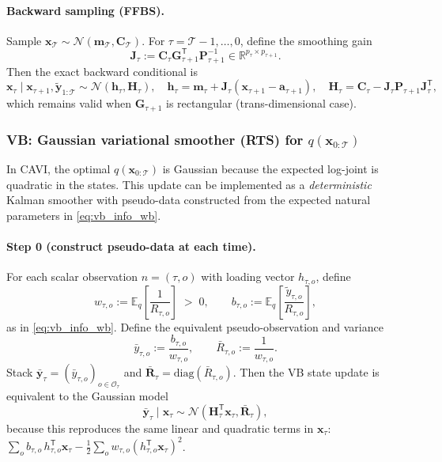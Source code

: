 \documentclass[11pt]{article}
\newcommand{\R}{\mathbb{R}}
\newcommand{\1}{\mathbb{I}}
\newcommand{\N}{\mathcal{N}}
\newcommand{\diag}{\mathrm{diag}}
\newcommand{\T}{\mathsf{T}}
\newcommand{\E}{\mathbb{E}}
\begin{document}
\paragraph{Backward sampling (FFBS).}
Sample $\bm x_\mathcal{T}\sim \N(\bm m_\mathcal{T},\bm C_\mathcal{T})$.
For $\tau=\mathcal{T}-1,\dots,0$, define the smoothing gain
\begin{equation}
\bm J_\tau := \bm C_\tau \bm G_{\tau+1}^\T \bm P_{\tau+1}^{-1}
\in\R^{p_\tau\times p_{\tau+1}}. \label{eq:ffbs_J}
\end{equation}
Then the exact backward conditional is
\begin{equation}
\bm x_\tau \mid \bm x_{\tau+1},\tilde{\bm y}_{1:\mathcal{T}}
\sim \N(\bm h_\tau,\bm H_\tau),
\quad
\bm h_\tau=\bm m_\tau+\bm J_\tau(\bm x_{\tau+1}-\bm a_{\tau+1}),
\quad
\bm H_\tau=\bm C_\tau-\bm J_\tau \bm P_{\tau+1}\bm J_\tau^\T,
\label{eq:ffbs_backward}
\end{equation}
which remains valid when $\bm G_{\tau+1}$ is rectangular (trans-dimensional case).

\subsubsection*{VB: Gaussian variational smoother (RTS) for $q(\bm x_{0:\mathcal{T}})$}
In CAVI, the optimal $q(\bm x_{0:\mathcal{T}})$ is Gaussian because the expected log-joint is quadratic in the states.
This update can be implemented as a \emph{deterministic} Kalman smoother with pseudo-data constructed from the
expected natural parameters in \eqref{eq:vb_info_wb}.

\paragraph{Step 0 (construct pseudo-data at each time).}
For each scalar observation $n=(\tau,o)$ with loading vector $h_{\tau,o}$, define
\[
w_{\tau,o}:=\E_q\!\left[\frac{1}{R_{\tau,o}}\right] \;>\;0,
\qquad
b_{\tau,o}:=\E_q\!\left[\frac{\tilde y_{\tau,o}}{R_{\tau,o}}\right],
\]
as in \eqref{eq:vb_info_wb}. Define the equivalent pseudo-observation and variance
\begin{equation}
\bar y_{\tau,o}:=\frac{b_{\tau,o}}{w_{\tau,o}},
\qquad
\bar R_{\tau,o}:=\frac{1}{w_{\tau,o}}.
\label{eq:vb_pseudodata_scalar}
\end{equation}
Stack $\bar{\bm y}_\tau=(\bar y_{\tau,o})_{o\in\mathcal{O}_\tau}$ and $\bar{\bm R}_\tau=\diag(\bar R_{\tau,o})$.
Then the VB state update is equivalent to the Gaussian model
\[
\bar{\bm y}_\tau \mid \bm x_\tau \sim \N(\bm H_\tau^\T\bm x_\tau,\bar{\bm R}_\tau),
\]
because this reproduces the same linear and quadratic terms in $\bm x_\tau$:
$\sum_o b_{\tau,o}\,h_{\tau,o}^\T\bm x_\tau-\tfrac12\sum_o w_{\tau,o}(h_{\tau,o}^\T\bm x_\tau)^2$.
\end{document}
